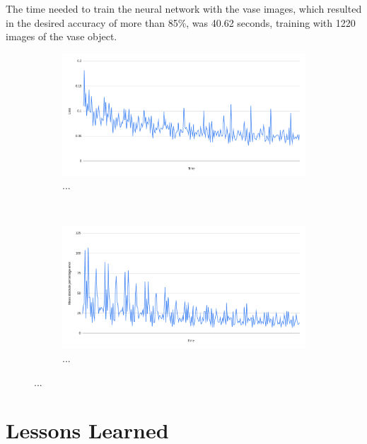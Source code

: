 The time needed to train the neural network with the vase images, which resulted in the desired accuracy of more than 85\%, was 40.62 seconds, training with 1220 images of the vase object.


\begin{figure}[h!]
	\centering
	\begin{subfigure}[t]{\textwidth}
		\centering
		\includegraphics[width=\textwidth]{img/experiment1_results_lossOverTime.png}
		\caption{...}
	\end{subfigure}
	~ 
	\begin{subfigure}[t]{\textwidth}
		\centering
		\includegraphics[width=\textwidth]{img/experiment1_results_MeanAbsolutePercentageErrorOverTime.png}
		\caption{...}
	\end{subfigure}
	\caption{...}
	\label{pic:experiment1_results_loss_and_percentageLoss}
\end{figure}


\section{Lessons Learned}

\filbreak
